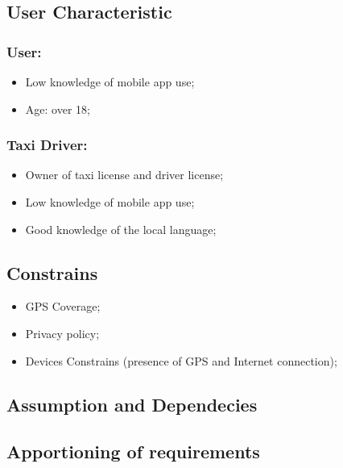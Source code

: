 \documentclass[english]{article}
\begin{document}
\subsection{User Characteristic}

\subsubsection{User:}
\begin{itemize}
	\item Low knowledge of mobile app use;
	\item Age: over 18;
\end{itemize}

\subsubsection{Taxi Driver:}
\begin{itemize}
	\item Owner of taxi license and driver license;
	\item Low knowledge of mobile app use;
	\item Good knowledge of the local language;
\end{itemize}

\subsection{Constrains}
\begin{itemize}
	\item GPS Coverage;
	\item Privacy policy;
	\item Devices Constrains (presence of GPS and Internet connection);
\end{itemize}

\subsection{Assumption and Dependecies}

\subsection{Apportioning of requirements}
\end{document}
